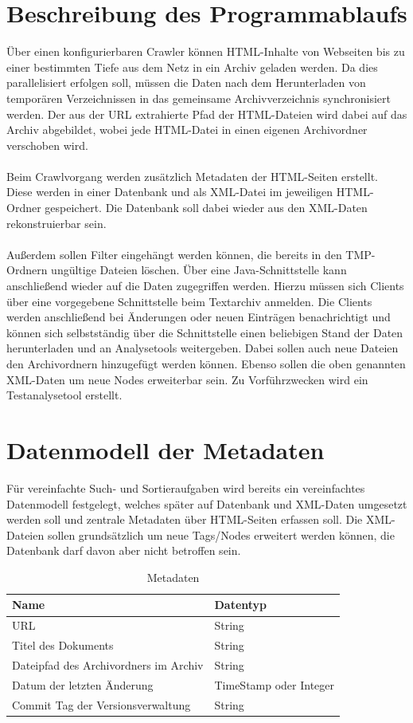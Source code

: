 \chapter{Beschreibung des Programmablaufs}
Über einen konfigurierbaren Crawler können HTML-Inhalte von Webseiten bis zu einer bestimmten Tiefe
aus dem Netz in ein Archiv geladen werden. Da dies parallelisiert erfolgen soll,
müssen die Daten nach dem Herunterladen von temporären Verzeichnissen in das gemeinsame
Archivverzeichnis synchronisiert werden. Der aus der URL extrahierte Pfad der HTML-Dateien wird
dabei auf das Archiv abgebildet, wobei jede HTML-Datei in einen eigenen Archivordner verschoben wird. \\ \\
Beim Crawlvorgang werden zusätzlich Metadaten der HTML-Seiten erstellt. 
Diese werden in einer Datenbank und als XML-Datei im jeweiligen HTML-Ordner gespeichert.
Die Datenbank soll dabei wieder aus den XML-Daten rekonstruierbar sein. \\ \\
Außerdem sollen Filter eingehängt werden können, die bereits in den TMP-Ordnern ungültige Dateien löschen.
Über eine Java-Schnittstelle kann anschließend wieder auf die Daten zugegriffen werden.
Hierzu müssen sich Clients über eine vorgegebene Schnittstelle beim Textarchiv anmelden.
Die Clients werden anschließend bei Änderungen oder neuen Einträgen benachrichtigt und können sich selbstständig über die Schnittstelle einen beliebigen Stand der Daten herunterladen und an Analysetools weitergeben.
Dabei sollen auch neue Dateien den Archivordnern hinzugefügt werden können.
Ebenso sollen die oben genannten XML-Daten um neue Nodes erweiterbar sein.
Zu Vorführzwecken wird ein Testanalysetool erstellt.

\chapter{Datenmodell der Metadaten}
Für vereinfachte Such- und Sortieraufgaben wird bereits ein vereinfachtes Datenmodell festgelegt, welches
später auf Datenbank und XML-Daten umgesetzt werden soll und zentrale Metadaten über HTML-Seiten erfassen soll.
Die XML-Dateien sollen grundsätzlich um neue Tags/Nodes erweitert werden können, die Datenbank darf davon aber nicht betroffen sein.
\begin{table}[h]
\centering
\begin{tabular}{|l|l|}	
	\hline
	Name & Datentyp \\
	\hline
	URL & String \\
	Titel des Dokuments & String \\ %
	Dateipfad des Archivordners im Archiv & String \\
	Datum der letzten Änderung & TimeStamp oder Integer \\
	Commit Tag der Versionsverwaltung & String \\
	\hline
\end{tabular}
\caption{Metadaten}
\end{table}

